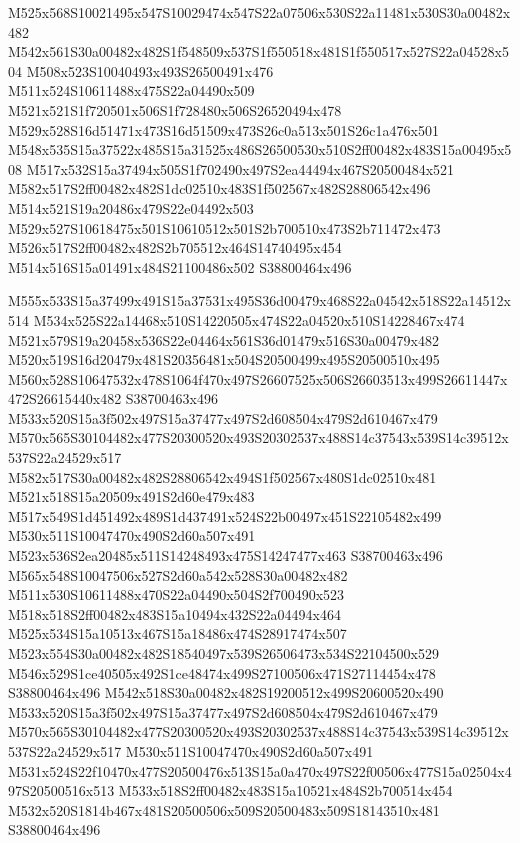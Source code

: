\documentclass{article}
\begin{document}
\begin{multicols}{2}
M525x568S10021495x547S10029474x547S22a07506x530S22a11481x530S30a00482x482 M542x561S30a00482x482S1f548509x537S1f550518x481S1f550517x527S22a04528x504 M508x523S10040493x493S26500491x476 M511x524S10611488x475S22a04490x509 M521x521S1f720501x506S1f728480x506S26520494x478 M529x528S16d51471x473S16d51509x473S26c0a513x501S26c1a476x501 M548x535S15a37522x485S15a31525x486S26500530x510S2ff00482x483S15a00495x508 M517x532S15a37494x505S1f702490x497S2ea44494x467S20500484x521 M582x517S2ff00482x482S1dc02510x483S1f502567x482S28806542x496 M514x521S19a20486x479S22e04492x503 M529x527S10618475x501S10610512x501S2b700510x473S2b711472x473 M526x517S2ff00482x482S2b705512x464S14740495x454 M514x516S15a01491x484S21100486x502 S38800464x496

M555x533S15a37499x491S15a37531x495S36d00479x468S22a04542x518S22a14512x514 M534x525S22a14468x510S14220505x474S22a04520x510S14228467x474 M521x579S19a20458x536S22e04464x561S36d01479x516S30a00479x482 M520x519S16d20479x481S20356481x504S20500499x495S20500510x495 M560x528S10647532x478S1064f470x497S26607525x506S26603513x499S26611447x472S26615440x482 S38700463x496 M533x520S15a3f502x497S15a37477x497S2d608504x479S2d610467x479 M570x565S30104482x477S20300520x493S20302537x488S14c37543x539S14c39512x537S22a24529x517 M582x517S30a00482x482S28806542x494S1f502567x480S1dc02510x481 M521x518S15a20509x491S2d60e479x483 M517x549S1d451492x489S1d437491x524S22b00497x451S22105482x499 M530x511S10047470x490S2d60a507x491 M523x536S2ea20485x511S14248493x475S14247477x463 S38700463x496 M565x548S10047506x527S2d60a542x528S30a00482x482 M511x530S10611488x470S22a04490x504S2f700490x523 M518x518S2ff00482x483S15a10494x432S22a04494x464 M525x534S15a10513x467S15a18486x474S28917474x507 M523x554S30a00482x482S18540497x539S26506473x534S22104500x529 M546x529S1ce40505x492S1ce48474x499S27100506x471S27114454x478 S38800464x496 M542x518S30a00482x482S19200512x499S20600520x490 M533x520S15a3f502x497S15a37477x497S2d608504x479S2d610467x479 M570x565S30104482x477S20300520x493S20302537x488S14c37543x539S14c39512x537S22a24529x517 M530x511S10047470x490S2d60a507x491 M531x524S22f10470x477S20500476x513S15a0a470x497S22f00506x477S15a02504x497S20500516x513 M533x518S2ff00482x483S15a10521x484S2b700514x454 M532x520S1814b467x481S20500506x509S20500483x509S18143510x481 S38800464x496 


\end{multicols}
\end{document}
